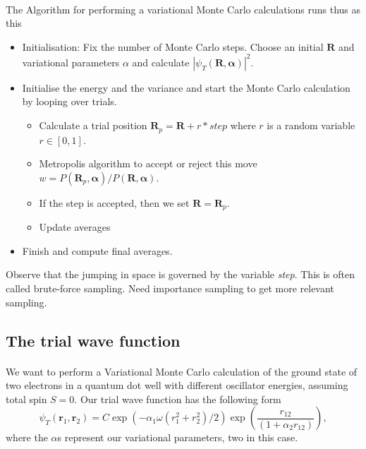\documentclass[aip,jcp,reprint,floatfix]{revtex4-1}
\begin{document}
\begin{itemize}
\paragraph{}
The Algorithm for performing a variational Monte Carlo calculations runs thus as this

\begin{itemize}
   \item Initialisation: Fix the number of Monte Carlo steps. Choose an initial $\bm{R}$ and variational parameters $\alpha$ and calculate $\left|\psi_T(\bm{R},\bm{\alpha})\right|^2$. 

   \item Initialise the energy and the variance and start the Monte Carlo calculation by looping over trials.
\begin{itemize}

      \item Calculate  a trial position  $\bm{R}_p=\bm{R}+r*step$ where $r$ is a random variable $r \in [0,1]$.

      \item Metropolis algorithm to accept or reject this move  $w = P(\bm{R}_p,\bm{\alpha})/P(\bm{R},\bm{\alpha})$.

      \item If the step is accepted, then we set $\bm{R}=\bm{R}_p$. 

      \item Update averages

\end{itemize}

\noindent
   \item Finish and compute final averages.
\end{itemize}

\noindent
Observe that the jumping in space is governed by the variable \emph{step}. This is often called brute-force sampling.
Need importance sampling to get more relevant sampling.



\subsection*{The trial wave function}

\paragraph{}
We want to perform  a Variational Monte Carlo calculation of the ground state of two electrons in a quantum dot well with different oscillator energies, assuming total spin $S=0$.
Our trial wave function has the following form
\begin{equation}
   \psi_{T}(\bm{r}_1,\bm{r}_2) = 
   C\exp{\left(-\alpha_1\omega(r_1^2+r_2^2)/2\right)}
   \exp{\left(\frac{r_{12}}{(1+\alpha_2 r_{12})}\right)}, 
\label{eq:trial}
\end{equation}
where the $\alpha$s represent our variational parameters, two in this case.


\end{itemize}
\end{document}
